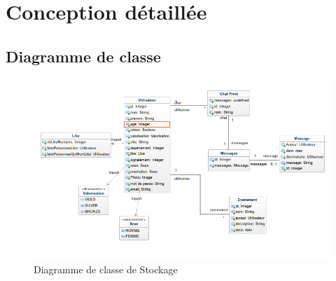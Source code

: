 \chapter{Conception détaillée}
\section{Diagramme de classe}
\vfill
\begin{figure}[ht!]
  \centering
   \caption{Diagramme de classe de Stockage}
   \includegraphics[scale=0.6]{ddc}
\end{figure}
\newpage
